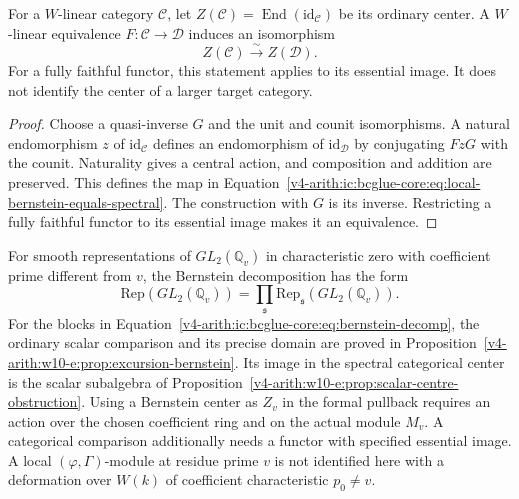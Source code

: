 \begin{proposition}
\label{v4-arith:ic:bcglue-core:thm:local-bernstein}
For a $W$-linear category $\mathcal C$, let
$Z(\mathcal C)=\operatorname{End}(\mathrm{id}_{\mathcal C})$
be its ordinary center. A $W$-linear equivalence
$F:\mathcal C\to\mathcal D$ induces an isomorphism
\begin{equation}
\label{v4-arith:ic:bcglue-core:eq:local-bernstein-equals-spectral}
 Z(\mathcal C)\xrightarrow{\sim}Z(\mathcal D).
\end{equation}
For a fully faithful functor, this statement applies to its essential
image. It does not identify the center of a larger target category.
\end{proposition}

\begin{proof}
Choose a quasi-inverse $G$ and the unit and counit isomorphisms.
A natural endomorphism $z$ of $\mathrm{id}_{\mathcal C}$ defines
an endomorphism of $\mathrm{id}_{\mathcal D}$ by conjugating
$FzG$ with the counit. Naturality gives a central action, and
composition and addition are preserved. This defines the map in
Equation~\eqref{v4-arith:ic:bcglue-core:eq:local-bernstein-equals-spectral}.
The construction with $G$
is its inverse. Restricting a fully faithful functor to its essential
image makes it an equivalence.
\end{proof}

\begin{remark}
\label{v4-arith:ic:bcglue-core:rem:local-domain}
For smooth representations of $GL_2(\mathbb Q_v)$ in
characteristic zero with coefficient prime different from $v$,
the Bernstein decomposition has the form
\begin{equation}
\label{v4-arith:ic:bcglue-core:eq:bernstein-decomp}
 \mathrm{Rep}(GL_2(\mathbb Q_v))
   =\prod_{\mathfrak s}\mathrm{Rep}_{\mathfrak s}(GL_2(\mathbb Q_v)).
\end{equation}
For the blocks in Equation~\eqref{v4-arith:ic:bcglue-core:eq:bernstein-decomp},
the ordinary scalar comparison and its precise domain are proved in
Proposition~\ref{v4-arith:w10-e:prop:excursion-bernstein}.
Its image in the spectral categorical center is the scalar subalgebra
of Proposition~\ref{v4-arith:w10-e:prop:scalar-centre-obstruction}.
Using a Bernstein center as $Z_v$ in the formal pullback requires
an action over the chosen coefficient ring and on the actual module
$M_v$. A categorical comparison additionally needs a functor with
specified essential image. A local $(\varphi,\Gamma)$-module at
residue prime $v$ is not identified here with a deformation over
$W(k)$ of coefficient characteristic $p_0\ne v$.
\end{remark}

